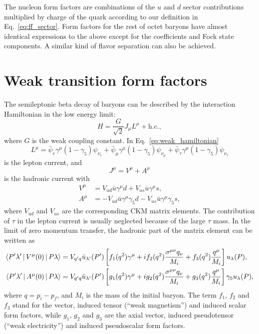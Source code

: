 \documentclass[aps,prc,preprint,groupedaddress,showpacs,superscriptaddress,floatfix]{revtex4-1}
\begin{document}
%
The nucleon form factors are combinations of the $u$ and $d$ sector contributions multiplied by charge of the quark according to our definition in Eq.~\eqref{eq:ff_sector}. Form factors for the rest of octet baryons have almost identical expressions to the above except for the coefficients and Fock state components. A similar kind of flavor separation can also be achieved.

\section{Weak transition form factors\label{sec:beta_decay}}
The semileptonic beta decay of baryons can be described by the interaction Hamiltonian in the low energy limit:
%
\begin{equation}
  H = \frac{G}{\sqrt{2}}J_\mu L^\mu + \mathrm{h.c.},
  \label{eq:weak_hamiltonian}
\end{equation}
%
where $G$ is the weak coupling constant.
In Eq.~\eqref{eq:weak_hamiltonian}
%
\begin{equation}
  L^\mu = \bar\psi_e \gamma^\mu(1-\gamma_5)\psi_{\nu_e}
  + \bar\psi_\mu \gamma^\mu(1-\gamma_5)\psi_{\nu_\mu}
  + \bar\psi_\tau \gamma^\mu(1-\gamma_5)\psi_{\nu_\tau}
  \label{eq:lepton_current}
\end{equation}
%
is the lepton current, and
%
\begin{equation}
  J^\mu = V^\mu + A^\mu
  \label{eq:hadronic_current}
\end{equation}
%
is the hadronic current with
%
\begin{align}
  V^\mu &= V_{ud} \bar{u}\gamma^\mu d + V_{us} \bar{u}\gamma^\mu s, \label{eq:va_current_1}\\
  A^\mu &= - V_{ud} \bar{u}\gamma^\mu\gamma_5 d - V_{us} \bar{u}\gamma^\mu\gamma_5 s, \label{eq:va_current_2}
\end{align}
%
where $V_{ud}$ and $V_{us}$ are the corresponding CKM matrix elements. The contribution of $\tau$ in the lepton current is usually neglected because of the large $\tau$ mass.
In the limit of zero momentum transfer, the hadronic part of the matrix element can be written as
%
\begin{align}
  \Braket{P'\lambda' | V^\mu(0) | P\lambda} &= V_{q'q} \bar{u}_{\lambda'}(P')
  \left[ f_1(q^2)\gamma^\mu + i f_2(q^2)\frac{\sigma^{\mu\nu}q_\nu}{M_i}
    + f_3(q^2)\frac{q^\mu}{M_i} \right] u_\lambda(P), \label{eq:me_hadron_1} \\
  \Braket{P'\lambda' | A^\mu(0) | P\lambda} &= V_{q'q} \bar{u}_{\lambda'}(P')
  \left[ g_1(q^2)\gamma^\mu + i g_2(q^2)\frac{\sigma^{\mu\nu}q_\nu}{M_i}
    + g_3(q^2) \frac{q^\mu}{M_i} \right]\gamma_5 u_\lambda(P), \label{eq:me_hadron_2}
\end{align}
%
where $q = p_i-p_f$, and $M_i$ is the mass of the initial baryon. The term $f_1$, $f_2$ and $f_3$ stand for the vector, induced tensor (``weak magnetism'') and induced scalar form factors, while $g_1$, $g_2$ and $g_3$ are the axial vector, induced pseudotensor (``weak electricity'') and induced pseudoscalar form factors.
\end{document}
